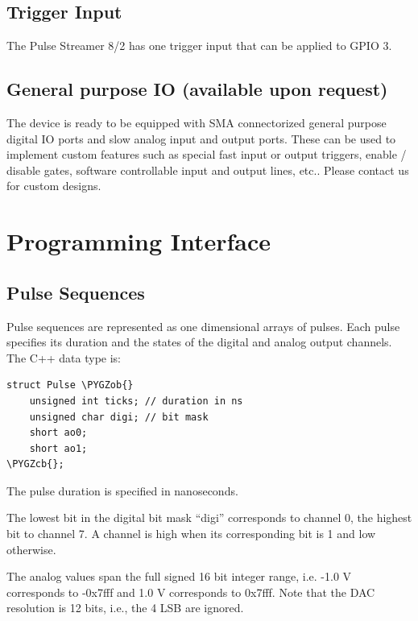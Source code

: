 \documentclass[letterpaper,10pt,english]{sphinxmanual}
\def\PYGZob{\char`\{}
\def\PYGZcb{\char`\}}
\begin{document}
\section{Trigger Input}
\label{sections/hardware:trigger-input}
The Pulse Streamer 8/2 has one trigger input that can be applied to GPIO 3.


\section{General purpose IO (available upon request)}
\label{sections/hardware:general-purpose-io-available-upon-request}
The device is ready to be equipped with SMA connectorized general purpose digital IO ports and
slow analog input and output ports. These can be used to implement custom features such as special fast input or
output triggers, enable / disable gates, software controllable input and output lines, etc..
Please contact us for custom designs.


\chapter{Programming Interface}
\label{sections/interface:programming-interface}\label{sections/interface::doc}

\section{Pulse Sequences}
\label{sections/interface:pulse-sequences}
Pulse sequences are represented  as one dimensional arrays of pulses.
Each pulse specifies its duration and the states of the digital
and analog output channels. The C++ data type is:

\begin{Verbatim}[commandchars=\\\{\}]
struct Pulse \PYGZob{}
    unsigned int ticks; // duration in ns
    unsigned char digi; // bit mask
    short ao0;
    short ao1;
\PYGZcb{};
\end{Verbatim}

The pulse duration is specified in nanoseconds.

The lowest bit in the digital bit mask ``digi'' corresponds to channel 0, the highest bit to channel 7.
A channel is high when its corresponding bit is 1 and low otherwise.

The analog values span the full signed 16 bit integer range, i.e. -1.0 V corresponds
to -0x7fff and 1.0 V corresponds to 0x7fff. Note that the DAC resolution is 12 bits,
i.e., the 4 LSB are ignored.
\end{document}
